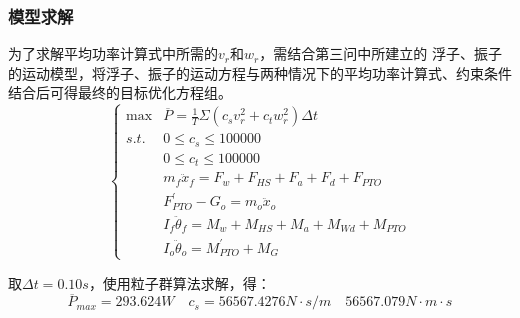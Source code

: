 \documentclass{my_paper}
\begin{document}
\subsubsection{模型求解}
为了求解平均功率计算式中所需的$v_r$和$w_r$，需结合第三问中所建立的
浮子、振子的运动模型，将浮子、振子的运动方程与两种情况下的平均功率计算式、约束条件结合后可得最终的目标优化方程组。
\begin{equation}
    \left\{\begin{matrix}
        \max & \overline{P}=\frac{1}{T}\Sigma{(c_{s} v_{r}^2 + c_{t} w_{r}^2) \Delta t}\\
        s.t. & 0 \leq c_s\leq 100000 \\
            & 0 \leq c_t\leq 100000 \\
            &  m_f \ddot x_f = F_w+F_{HS}+F_a+F_d+F_{PTO}\\
            &  F_{PTO}^{'}-G_o=m_o\ddot x_o\\
            & I_{f} \ddot \theta_{f} = M_w+M_{HS}+M_a+M_{Wd}+M_{PTO}\\
            & I_{o} \ddot \theta_{o} = M_{PTO}^{'}+M_{G}
    \end{matrix}
    \right.
\end{equation}

  

取$\Delta t = 0.10s$，使用粒子群算法求解，得：
\begin{equation}
    \overline{P}_{max}=293.624W \quad c_s=56567.4276N\cdot s/m  \quad 56567.079N\cdot m \cdot s 
\end{equation}





\end{document}
